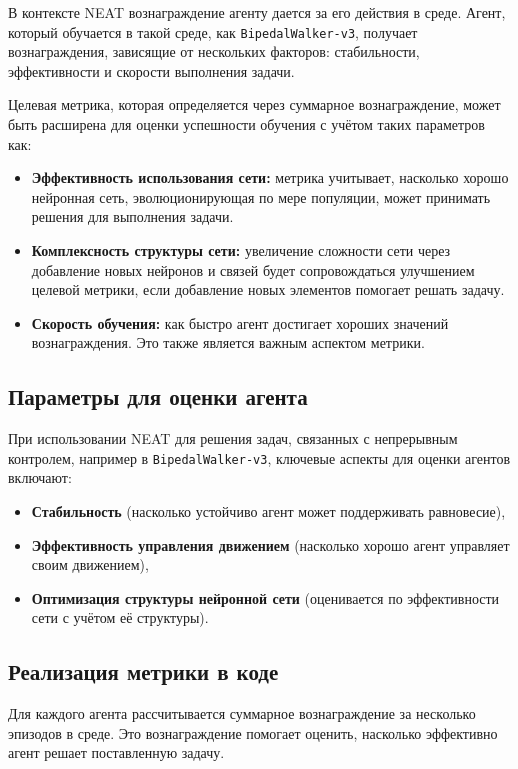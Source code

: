 \documentclass[a4paper,12pt]{article}
\begin{document}
В контексте NEAT вознаграждение агенту дается за его действия в среде. Агент, который обучается в такой среде, как \texttt{BipedalWalker-v3}, получает вознаграждения, зависящие от нескольких факторов: стабильности, эффективности и скорости выполнения задачи.

Целевая метрика, которая определяется через суммарное вознаграждение, может быть расширена для оценки успешности обучения с учётом таких параметров как:
\begin{itemize}
    \item \textbf{Эффективность использования сети:} метрика учитывает, насколько хорошо нейронная сеть, эволюционирующая по мере популяции, может принимать решения для выполнения задачи.
    \item \textbf{Комплексность структуры сети:} увеличение сложности сети через добавление новых нейронов и связей будет сопровождаться улучшением целевой метрики, если добавление новых элементов помогает решать задачу.
    \item \textbf{Скорость обучения:} как быстро агент достигает хороших значений вознаграждения. Это также является важным аспектом метрики.
\end{itemize}

\subsection{Параметры для оценки агента}

При использовании NEAT для решения задач, связанных с непрерывным контролем, например в \texttt{BipedalWalker-v3}, ключевые аспекты для оценки агентов включают:
\begin{itemize}
    \item \textbf{Стабильность} (насколько устойчиво агент может поддерживать равновесие),
    \item \textbf{Эффективность управления движением} (насколько хорошо агент управляет своим движением),
    \item \textbf{Оптимизация структуры нейронной сети} (оценивается по эффективности сети с учётом её структуры).
\end{itemize}

\subsection{Реализация метрики в коде}

Для каждого агента рассчитывается суммарное вознаграждение за несколько эпизодов в среде. Это вознаграждение помогает оценить, насколько эффективно агент решает поставленную задачу.
\end{document}
